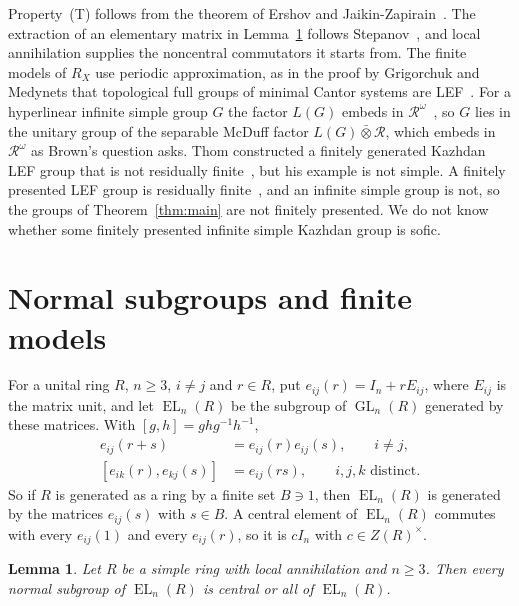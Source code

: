 \documentclass[11pt]{amsart}
\newtheorem{lemma}[theorem]{Lemma}
\newcommand{\EL}{\operatorname{EL}}
\newcommand{\GL}{\operatorname{GL}}
\begin{document}
Property~\textup{(T)} follows from the theorem of Ershov and
Jaikin-Zapirain~\cite{EJZ}. The extraction of an elementary matrix in
Lemma~\ref{lem:normal} follows Stepanov~\cite[Lemma~4.3]{Stepanov}, and
local annihilation supplies the noncentral commutators it starts from.
The finite models of $R_X$ use periodic approximation, as in the proof
by Grigorchuk and Medynets that topological full groups of minimal
Cantor systems are LEF~\cite[Theorem~2.6]{GM}. For a hyperlinear
infinite simple group $G$ the factor $L(G)$ embeds in
$\mathcal R^\omega$~\cite[Proposition~7.1]{Ozawa}, so $G$ lies in the
unitary group of the separable McDuff factor
$L(G)\mathbin{\bar\otimes}\mathcal R$, which embeds in $\mathcal R^\omega$
as Brown's question asks. Thom constructed a finitely generated Kazhdan
LEF group that is not residually finite~\cite{Thom}, but his example is
not simple. A finitely presented LEF group is residually
finite~\cite{VershikGordon}, and an infinite simple group is not, so the
groups of Theorem~\ref{thm:main} are not finitely presented. We do not
know whether some finitely presented infinite simple Kazhdan group is
sofic.

\section{Normal subgroups and finite models}

For a unital ring $R$, $n\ge3$, $i\ne j$ and $r\in R$, put
$e_{ij}(r)=I_n+rE_{ij}$, where $E_{ij}$ is the matrix unit, and let
$\EL_n(R)$ be the subgroup of $\GL_n(R)$ generated by these matrices.
With $[g,h]=ghg^{-1}h^{-1}$,
\begin{equation}\label{eq:elementary}
 \begin{aligned}
 e_{ij}(r+s)&=e_{ij}(r)e_{ij}(s),\qquad i\ne j,\\
 [e_{ik}(r),e_{kj}(s)]&=e_{ij}(rs),\qquad i,j,k\text{ distinct}.
 \end{aligned}
\end{equation}
So if $R$ is generated as a ring by a finite set $B\ni1$, then $\EL_n(R)$
is generated by the matrices $e_{ij}(s)$ with $s\in B$. A central element
of $\EL_n(R)$ commutes with every $e_{ij}(1)$ and every $e_{ij}(r)$, so it
is $cI_n$ with $c\in Z(R)^\times$.

\begin{lemma}\label{lem:normal}
Let $R$ be a simple ring with local annihilation and $n\ge3$. Then every
normal subgroup of $\EL_n(R)$ is central or all of $\EL_n(R)$.
\end{lemma}
\end{document}
